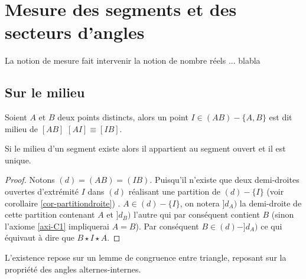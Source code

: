     \section{Mesure des segments et des secteurs d'angles}

La notion de mesure fait intervenir la notion de nombre réels ... blabla

        \subsection{Sur le milieu}

\begin{defi}[Milieu]
    Soient $A$ et $B$ deux points distincts, alors un point $I\in(AB)-\{A,B\}$ est dit milieu de $[AB]$ \ssi $[AI]\equiv [IB]$. 
\end{defi}
\begin{prop}
    Si le milieu d'un segment existe alors il appartient au segment ouvert et il est unique. 
\begin{proof}
    Notons $(d)=(AB)=(IB)$. Puisqu'il n'existe que deux demi-droites ouvertes d'extrémité $I$ dans $(d)$ réalisant une partition de $(d)-\{I\}$ (voir corollaire \ref{cor-partitiondroite}) . $A\in (d)-\{I\}$, on notera $]d_A)$ la demi-droite de cette partition contenant $A$ et $]d_B)$ l'autre qui par conséquent contient $B$ (sinon l'axiome \ref{axi-C1} impliquerai $A=B$). Par conséquent $B\in (d)-]d_A)$ ce qui équivaut à dire que $B\star I\star A$.
\end{proof}
\end{prop}
\begin{rema}
    L'existence repose sur un lemme de congruence entre triangle, reposant sur la propriété des angles alternes-internes. 
\end{rema}
